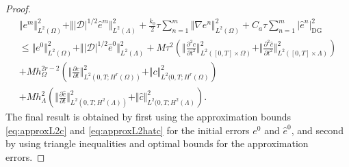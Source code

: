 \documentclass[pdflatex,sn-mathphys-num]{sn-jnl}%
\newcommand{\DG}{\mathrm{DG}}
\theoremstyle{thmstyleone}%
\theoremstyle{thmstyletwo}%
\theoremstyle{thmstylethree}%
\begin{document}
\begin{proof}
\begin{align*}
    \Vert   e^m \Vert_{L^2(\Omega)}^2
    + \Vert \vert \mathcal{D}\vert^{1/2} \hat e^m \Vert_{L^2(\Lambda)}^2
+\frac{k_0}{2}  \tau \sum_{n=1}^m \Vert \nabla e^n \Vert_{L^2(\Omega)}^2
+ C_a \tau \sum_{n=1}^m \vert \hat e^n \vert_{\DG}^2
\nonumber\\
     \leq  
\Vert  e^{0} \Vert_{L^2(\Omega)}^2
+\Vert \vert \mathcal{D}\vert^{1/2} \hat e^{0} \Vert_{L^2(\Lambda)}^2 
 + M \tau^2 \left( \Vert \frac{\partial^2 c}{\partial t^2}\Vert_{L^2([0,T]\times \Omega)}^2
     + \Vert \frac{\partial^2 \hat c}{\partial t^2}\Vert_{L^2([0,T]\times \Lambda)}^2 \right)
 \nonumber\\
 + M h_\Omega^{2r-2}\left(
 \Vert \frac{\partial c}{\partial t}\Vert_{L^2(0,T;H^r(\Omega))}^2
+ \Vert c\Vert_{L^2(0,T;H^r(\Omega)}^2\right)
\nonumber\\
 + M h_\Lambda^{2} \left(\Vert \frac{\partial \hat c}{\partial t}\Vert_{L^2(0,T;H^2(\Lambda))}^2
+\Vert \hat c\Vert_{L^2(0,T;H^2(\Lambda)}^2\right).
     \end{align*}
The final result is obtained by first using the approximation bounds \eqref{eq:approxL2c} and \eqref{eq:approxL2hatc} for the initial errors $e^0$ and $\hat e^0$, and second by using triangle inequalities and optimal bounds for the approximation errors.
%

\end{proof}
\end{document}
